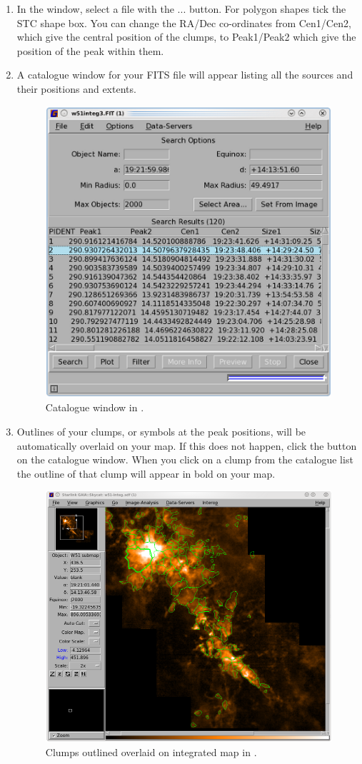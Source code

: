 \documentclass[11pt,oneside,chapters]{starlink}
\begin{document}
\begin{enumerate}[label=(\textbf{\arabic*})]
\item In the  window, select a file
with the ... button. For polygon shapes tick
the STC shape box. You can change the RA/Dec co-ordinates from
Cen1/Cen2, which give the central position of the clumps, to
Peak1/Peak2 which give the position of the peak within them.

\item A catalogue window for your FITS file will appear listing all
the sources and their positions and extents.

\begin{figure}[h!]
\begin{center}
\includegraphics[width=0.5\linewidth]{sc20_plotclumps5}
\caption[Catalogue window in \gaia.]{\label{fig:gaia_clumps3}
  Catalogue window in \gaia.}
\end{center}
\end{figure}

\item Outlines of your clumps, or symbols at the peak positions, will
be automatically overlaid on your map. If this does not happen, click
the  button on the catalogue window. When you click on
a clump from the catalogue list the outline of that clump will appear
in bold on your map.

\begin{figure}[h!]
\begin{center}
\includegraphics[width=0.6\linewidth]{sc20_plotclumps6}
\caption[Clumps outlined overlaid on integrated map in \gaia.]{\label{fig:gaia_clumps4}
  Clumps outlined overlaid on integrated map in \gaia.}
\end{center}
\end{figure}


\end{enumerate}
\end{document}
